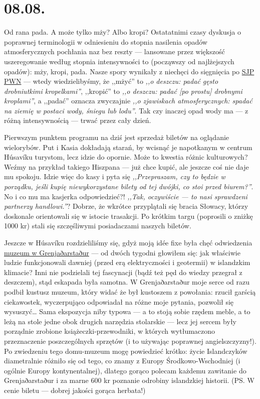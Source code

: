 \chapter*{08.08.}

Od rana pada. A może tylko mży? Albo kropi? Ostatatnimi czasy dyskusja o poprawnej terminologii w odniesieniu do stopnia nasilenia opadów atmosferycznych pochłania naz bez reszty --- lansowane przez większość uszeregowanie według stopnia intensywności to (począwszy od najlżejszych opadów): mży, kropi, pada. Nasze spory wynikały z niechęci do sięgnięcia po \href{http://sjp.pwn.pl/}{SJP PWN} --- wtedy wiedzielibyśmy, że ,,mżyć'' to \emph{,,o deszczu: padać gęsto drobniutkimi kropelkami''}, ,,kropić'' to \emph{,,o deszczu: padać [po prostu] drobnymi kroplami''}, a ,,padać'' oznacza zwyczajnie \emph{,,o zjawiskach atmosferycznych: spadać na ziemię w postaci wody, śniegu lub lodu''}. Tak czy inaczej opad wody ma --- z różną intensywnością --- trwać przez cały dzień.

Pierwszym punktem programu na dziś jest sprzedaż biletów na oglądanie wielorybów. Put i Kasia dokładają starań, by wcisnąć je napotkanym w centrum Húsavíku turystom, lecz idzie do opornie. Może to kwestia różnic kulturowych? Weźmy na przykład takiego Hiszpana --- już chce kupić, ale jeszcze coś nie daje mu spokoju. Idzie więc do kasy i pyta się \emph{,,Przepraszam, czy to będzie w porządku, jeśli kupię niewykorzystane bilety od tej dwójki, co stoi przed biurem?''}. No i co mu ma kasjerka odpowiedzieć?! \emph{,,Tak, oczywiście --- to nasi sprawdzeni partnerzy handlowi.''}? Dobrze, że wkrótce przyplątali się bracia Słowacy, którzy doskonale orientowali się w istocie trasakcji. Po krótkim targu (poprosili o zniżkę 1000 kr) stali się szczęśliwymi posiadaczami naszych biletów.


Jeszcze w Húsavíku rozdzieliliśmy się, gdyż moją idée fixe była chęć odwiedzenia \href{http://www.visithusavik.com/attractions/the-turf-house-museum/}{muzeum w Grenjaðarstaður} --- od dwóch tygodni głowiłem się: jak właściwie ludzie funkcjonowali dawniej (przed erą elektryczności i geotermii) w islandzkim klimacie? Inni nie podzielali tej fascynacji (bądź też pęd do wiedzy przegrał z deszczem), stąd eskapada była samotna. W Grenjaðarstaður moje serce od razu podbił kustusz muzeum, który widać że był kustoszem z powołania: rzucił garścią ciekawostek, wyczerpująco odpowiadał na różne moje pytania, pozwolił się wysuszyć… Sama ekspozycja niby typowa --- a to stoją sobie rzędem meble, a to leżą na stole jedne obok drugich narzędzia stolarskie --- lecz jej sercem były porządnie zrobione książeczki-przewodniki, w których wytłumaczono przeznaczenie poszczególnych sprzętów (i to używając poprawnej angielszczyzny!). Po zwiedzeniu tego domu-muzeum mogę powiedzieć krótko: życie Islandczyków diametralnie różniło się od tego, co znamy z Europy Środkowo-Wschodniej (i ogólnie Europy kontynentalnej), dlatego gorąco polecam każdemu zawitanie do Grenjaðarstaður i za marne 600 kr poznanie odrobiny islandzkiej historii. (PS. W cenie biletu --- dobrej jakości gorąca herbata!)


